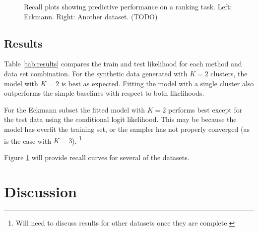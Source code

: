 \documentclass{article}
\begin{document}
\begin{figure}[t]
\center
\fbox{\rule[-.5cm]{0cm}{4cm} \rule[-.5cm]{4cm}{0cm}}
\fbox{\rule[-.5cm]{0cm}{4cm} \rule[-.5cm]{4cm}{0cm}}
\fbox{\rule[-.5cm]{0cm}{4cm} \rule[-.5cm]{4cm}{0cm}}
\caption{Recall plots showing predictive performance on a ranking task.  Left: Eckmann.  Right: Another dataset.  (TODO)}
\label{fig:recall}
\end{figure}

\subsection{Results}

 Table \ref{tab:results} compares the train and test likelihood for each method and data set combination.  For the synthetic data generated with $K=2$ clusters, the model with $K=2$ is best as expected.  Fitting the model with a single cluster also outperforms the simple baselines with respect to both likelihoods.  

For the Eckmann subset the fitted model with $K=2$ performs best except for the test data using the conditional logit likelihood.  This may be because the model has overfit the training set, or the sampler has not properly converged (as is the case with $K=3$).  \footnote{Will need to discuss results for other datasets once they are complete.}

Figure \ref{fig:recall} will provide recall curves for several of the datasets.

\section{Discussion}

\end{document}
